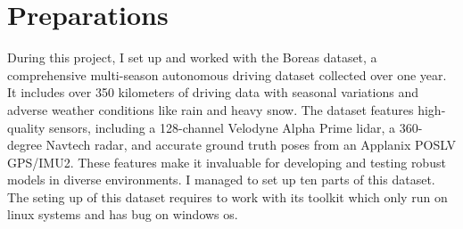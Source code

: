 \chapter{Preparations}
During this project, I set up and worked with the Boreas dataset, a comprehensive multi-season autonomous driving dataset collected over one year. It includes over 350 kilometers of driving data with seasonal variations and adverse weather conditions like rain and heavy snow. The dataset features high-quality sensors, including a 128-channel Velodyne Alpha Prime lidar, a 360-degree Navtech radar, and accurate ground truth poses from an Applanix POSLV GPS/IMU2. These features make it invaluable for developing and testing robust models in diverse environments.
I managed to set up ten parts of this dataset. The seting up of this dataset requires to work with its toolkit which only run on linux systems and has bug on windows os. 
